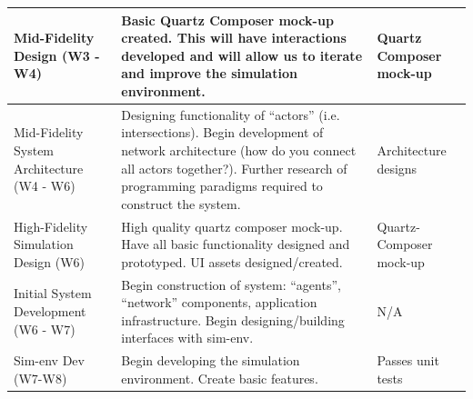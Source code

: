 \documentclass{report}
\begin{document}
\begin{longtable}[htbp] {| P{2.5cm} | P{10cm} | P{2.5cm} |}
    Mid-Fidelity Design (W3 - W4)              & Basic Quartz Composer mock-up created. This will have interactions developed and will allow us to iterate and improve the simulation environment.                                                                                                                                                                                                                                          & Quartz Composer mock-up                            \\ \hline
    Mid-Fidelity System Architecture (W4 - W6) & Designing functionality of ``actors'' (i.e. intersections). Begin development of network architecture (how do you connect all actors together?). Further research of programming paradigms required to construct the system.                                                                                                                                                                 & Architecture designs                               \\ \hline
    High-Fidelity Simulation Design (W6)       & High quality quartz composer mock-up. Have all basic functionality designed and prototyped. UI assets designed/created.                                                                                                                                                                                                                                                                    & Quartz-Composer mock-up                            \\ \hline
    Initial System Development (W6 - W7)       & Begin construction of system: ``agents'', ``network'' components, application infrastructure. Begin designing/building interfaces with sim-env.                                                                                                                                                                                                                                                & N/A                                                \\ \hline
    Sim-env Dev (W7-W8)                        & Begin developing the simulation environment. Create basic features.                                                                                                                                                                                                                                                                                                                        & Passes unit tests                                  \\ \hline

\end{longtable}
\end{document}
